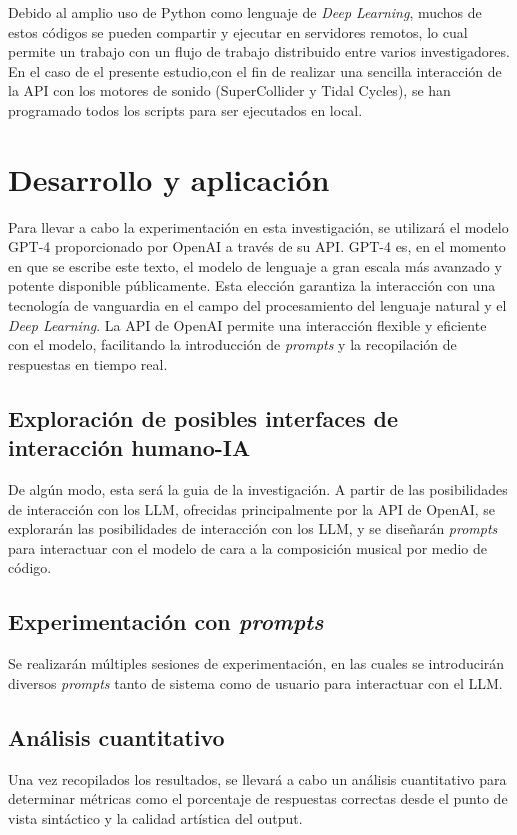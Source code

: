     Debido al amplio uso de Python como lenguaje de \emph{Deep Learning}, muchos de estos códigos se pueden compartir y ejecutar en servidores remotos, lo cual permite un trabajo con un flujo de trabajo distribuido entre varios investigadores. En el caso de el presente estudio,con el fin de realizar una sencilla interacción de la API con los motores de sonido (SuperCollider y Tidal Cycles), se han programado todos los scripts para ser ejecutados en local.


\section{Desarrollo y aplicación}

Para llevar a cabo la experimentación en esta investigación, se utilizará el modelo GPT-4 proporcionado por OpenAI a través de su API. GPT-4 es, en el momento en que se escribe este texto, el modelo de lenguaje a gran escala más avanzado y potente disponible públicamente. Esta elección garantiza la interacción con una tecnología de vanguardia en el campo del procesamiento del lenguaje natural y el \emph{Deep Learning}. La API de OpenAI permite una interacción flexible y eficiente con el modelo, facilitando la introducción de \emph{prompts} y la recopilación de respuestas en tiempo real.

\subsection{Exploración de posibles interfaces de interacción humano-IA}
De algún modo, esta será la guia de la investigación. A partir de las posibilidades de interacción con los LLM, ofrecidas principalmente por la API de OpenAI, se explorarán las posibilidades de interacción con los LLM, y se diseñarán \emph{prompts} para interactuar con el modelo de cara a la composición musical por medio de código.


\subsection{Experimentación con \emph{prompts}}
Se realizarán múltiples sesiones de experimentación, en las cuales se introducirán diversos \emph{prompts} tanto de sistema como de usuario para interactuar con el LLM.

\subsection{Análisis cuantitativo}
Una vez recopilados los resultados, se llevará a cabo un análisis cuantitativo para determinar métricas como el porcentaje de respuestas correctas desde el punto de vista sintáctico y la calidad artística del output.


